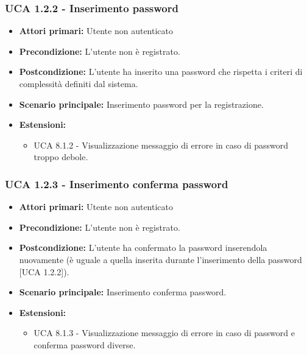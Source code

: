 \subsubsection{UCA 1.2.2 - Inserimento password}%
\begin{itemize}
\item \textbf{Attori primari:} Utente non autenticato
\item \textbf{Precondizione:} L'utente non è registrato.
\item \textbf{Postcondizione:} L'utente ha inserito una password che rispetta i criteri di complessità definiti dal sistema.
\item \textbf{Scenario principale:} Inserimento password per la registrazione.
\item \textbf{Estensioni:}
	\begin{itemize}
		\item UCA 8.1.2 - Visualizzazione messaggio di errore in caso di password troppo debole.
	\end{itemize}
\end{itemize}

\subsubsection{UCA 1.2.3 - Inserimento conferma password}%
\begin{itemize}
\item \textbf{Attori primari:} Utente non autenticato
\item \textbf{Precondizione:} L'utente non è registrato.
\item \textbf{Postcondizione:} L'utente ha confermato la password inserendola nuovamente (è uguale a quella inserita durante l'inserimento della password [UCA 1.2.2]).
\item \textbf{Scenario principale:} Inserimento conferma password.
\item \textbf{Estensioni:}
	\begin{itemize}
		\item UCA 8.1.3 - Visualizzazione messaggio di errore in caso di password e conferma password diverse.
	\end{itemize}
\end{itemize}

